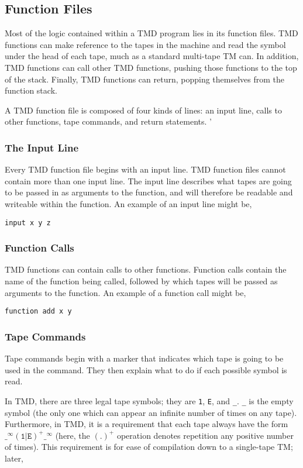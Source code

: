 \subsection{Function Files}

Most of the logic contained within a TMD program lies in its function files. TMD functions can make reference to the tapes in the machine and read the symbol under the head of each tape, much as a standard multi-tape TM can. In addition, TMD functions can call other TMD functions, pushing those functions to the top of the stack. Finally, TMD functions can return, popping themselves from the function stack.

A TMD function file is composed of four kinds of lines: an input line, calls to other functions, tape commands, and return statements. '

\subsubsection{The Input Line}

Every TMD function file begins with an input line. TMD function files cannot contain more than one input line. The input line describes what tapes are going to be passed in as arguments to the function, and will therefore be readable and writeable within the function. An example of an input line might be, 

\texttt{input x y z}

\subsubsection{Function Calls}

TMD functions can contain calls to other functions. Function calls contain the name of the function being called, followed by which tapes will be passed as arguments to the function. An example of a function call might be,

\texttt{function add x y}

\subsubsection{Tape Commands}

Tape commands begin with a marker that indicates which tape is going to be used in the command. They then explain what to do if each possible symbol is read.

In TMD, there are three legal tape symbols; they are \texttt{1}, \texttt{E}, and \texttt{_}. \texttt{_} is the empty symbol (the only one which can appear an infinite number of times on any tape). Furthermore, in TMD, it is a requirement that each tape always have the form $\texttt{_}^{\infty}(\texttt{1}|\texttt{E})^{+}\texttt{_}^{\infty}$ (here, the $(.)^+$ operation denotes repetition any positive number of times). This requirement is for ease of compilation down to a single-tape TM; later, 